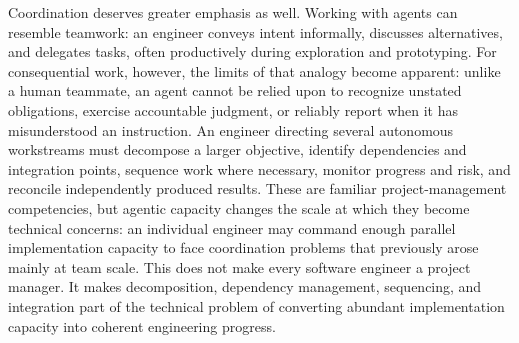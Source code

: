 
Coordination deserves greater emphasis as well. Working with agents can resemble teamwork: an engineer conveys intent informally, discusses alternatives, and delegates tasks, often productively during exploration and prototyping. For consequential work, however, the limits of that analogy become apparent: unlike a human teammate, an agent cannot be relied upon to recognize unstated obligations, exercise accountable judgment, or reliably report when it has misunderstood an instruction. An engineer directing several autonomous workstreams must decompose a larger objective, identify dependencies and integration points, sequence work where necessary, monitor progress and risk, and reconcile independently produced results. These are familiar project-management competencies, but agentic capacity changes the scale at which they become technical concerns: an individual engineer may command enough parallel implementation capacity to face coordination problems that previously arose mainly at team scale. This does not make every software engineer a project manager. It makes decomposition, dependency management, sequencing, and integration part of the technical problem of converting abundant implementation capacity into coherent engineering progress.




